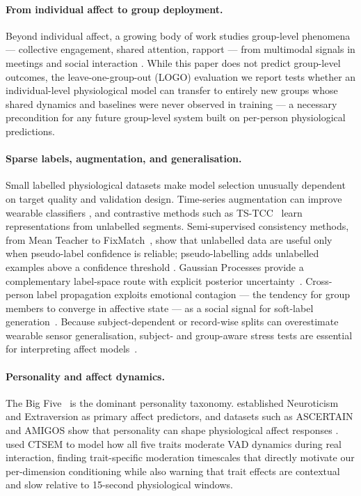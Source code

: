 \documentclass[sigconf,review,anonymous]{acmart}
\begin{document}
\paragraph{From individual affect to group deployment.}
Beyond individual affect, a growing body of work studies
group-level phenomena --- collective engagement, shared attention, rapport ---
from multimodal signals in meetings and social interaction
\cite{mccowan2005ami,alameda2015salsa,cabrera2018matchnmingle,sanchez2012emergent}.
While this paper does not predict group-level outcomes, the
leave-one-group-out (LOGO) evaluation we report tests whether an
individual-level physiological model can transfer to entirely new groups
whose shared dynamics and baselines were never observed in training ---
a necessary precondition for any future group-level system built on
per-person physiological predictions.

\paragraph{Sparse labels, augmentation, and generalisation.}
Small labelled physiological datasets make model selection unusually dependent
on target quality and validation design.
Time-series augmentation can improve wearable classifiers
\cite{um2017data,iwana2021augmentation}, and contrastive methods such as
TS-TCC~\cite{eldele2021tscc} learn representations from unlabelled segments.
Semi-supervised consistency methods, from Mean Teacher
\cite{tarvainen2017mean} to FixMatch~\cite{sohn2020fixmatch}, show that
unlabelled data are useful only when pseudo-label confidence is reliable;
pseudo-labelling adds unlabelled examples above a confidence threshold
\cite{lee2013pseudo}.
Gaussian Processes provide a complementary label-space route with explicit
posterior uncertainty~\cite{rasmussen2006gaussian,atcheson2017gp}.
Cross-person label propagation exploits emotional contagion --- the tendency
for group members to converge in affective state --- as a social signal for
soft-label generation~\cite{hatfield1993emotional}.
Because subject-dependent or record-wise splits can overestimate wearable
sensor generalisation, subject- and group-aware stress tests are essential
for interpreting affect models~\cite{ahmad2022survey,ventura2022validation}.

\paragraph{Personality and affect dynamics.}
The Big Five~\cite{john1999bigfive} is the dominant personality taxonomy.
\citet{watson1992traits} established Neuroticism and Extraversion as
primary affect predictors, and datasets such as ASCERTAIN and AMIGOS show
that personality can shape physiological affect responses
\cite{subramanian2018ascertain,mirandacorrea2021amigos}.
\citet{meng2026moderating} used CTSEM to model how all five traits moderate
VAD dynamics during real interaction, finding trait-specific moderation
timescales that directly motivate our per-dimension conditioning while also
warning that trait effects are contextual and slow relative to 15-second
physiological windows.
\end{document}
